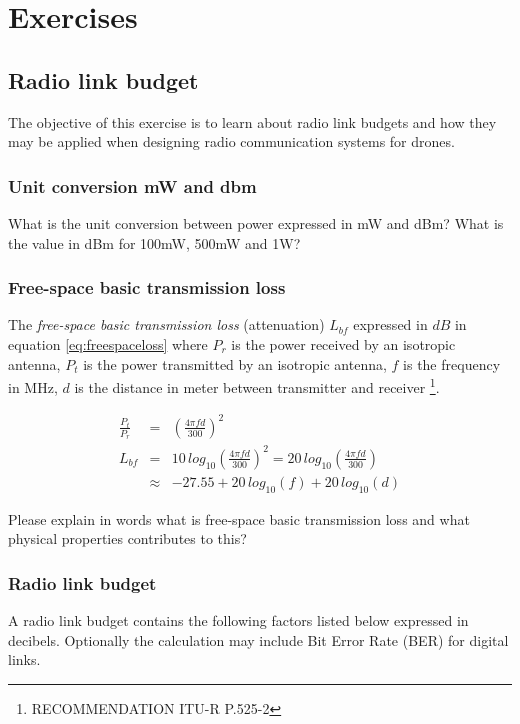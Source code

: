 \documentclass[a4paper,10pt,fleqn]{article}
\begin{document}
\section{Exercises}

\subsection{Radio link budget}
The objective of this exercise is to learn about radio link budgets and how they may be applied when designing radio communication systems for drones.

\subsubsection{Unit conversion mW and dbm}

What is the unit conversion between power expressed in mW and dBm? What is the value in dBm for 100mW, 500mW and 1W?

\subsubsection{Free-space basic transmission loss}
\label{sec:freesp}
The \textit{free-space basic transmission loss} (attenuation) $L_{bf}$ expressed in $dB$ in equation \ref{eq:freespaceloss} where $P_r$ is the power received by an isotropic antenna, $P_t$ is the power transmitted by an isotropic antenna, $f$ is the frequency in MHz, $d$ is the distance in meter between transmitter and receiver \footnote{RECOMMENDATION ITU-R P.525-2}. 

\begin{eqnarray}
\frac{P_t}{P_r} &=& \left(\frac{4 \pi f d}{300}\right)^2 \\
L_{bf} &=& 10 \, log_{10}\left(\frac{4 \pi f d}{300}\right)^2 = 20 \, log_{10}\left(\frac{4 \pi f d}{300}\right) \\
&\approx& -27.55 + 20 \, log_{10} (f) + 20 \, log_{10}\left(d\right)
\label{eq:freespaceloss}
\end{eqnarray}

Please explain in words what is free-space basic transmission loss and what physical properties contributes to this?

\subsubsection{Radio link budget}
A radio link budget contains the following factors listed below expressed in decibels. Optionally the calculation may include Bit Error Rate (BER) for digital links.
\end{document}
